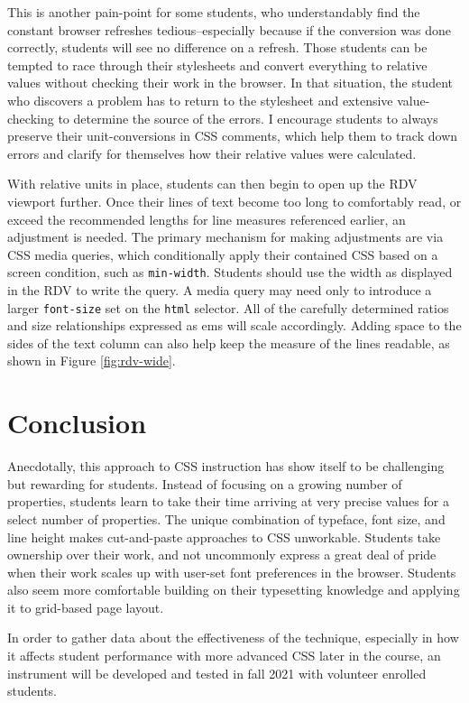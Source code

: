 \documentclass[sigplan,screen]{acmart}
\begin{document}
This is another pain-point for some students, who understandably find the constant browser refreshes tedious--especially because if the conversion was done correctly, students will see no difference on a refresh. Those students can be tempted to race through their stylesheets and convert everything to relative values without checking their work in the browser. In that situation, the student who discovers a problem has to return to the stylesheet and extensive value-checking to determine the source of the errors. I encourage students to always preserve their unit-conversions in CSS comments, which help them to track down errors and clarify for themselves how their relative values were calculated.

With relative units in place, students can then begin to open up the RDV viewport further. Once their lines of text become too long to comfortably read, or exceed the recommended lengths for line measures referenced earlier, an adjustment is needed. The primary mechanism for making adjustments are via CSS media queries, which conditionally apply their contained CSS based on a screen condition, such as \verb|min-width|. Students should use the width as displayed in the RDV to write the query. A media query may need only to introduce a larger \verb|font-size| set on the \verb|html| selector. All of the carefully determined ratios and size relationships expressed as ems will scale accordingly. Adding space to the sides of the text column can also help keep the measure of the lines readable, as shown in Figure \ref{fig:rdv-wide}.

\section{Conclusion}

Anecdotally, this approach to CSS instruction has show itself to be challenging but rewarding for students. Instead of focusing on a growing number of properties, students learn to take their time arriving at very precise values for a select number of properties. The unique combination of typeface, font size, and line height makes cut-and-paste approaches to CSS unworkable. Students take ownership over their work, and not uncommonly express a great deal of pride when their work scales up with user-set font preferences in the browser. Students also seem more comfortable building on their typesetting knowledge and applying it to grid-based page layout.

In order to gather data about the effectiveness of the technique, especially in how it affects student performance with more advanced CSS later in the course, an instrument will be developed and tested in fall 2021 with volunteer enrolled students.



\end{document}
